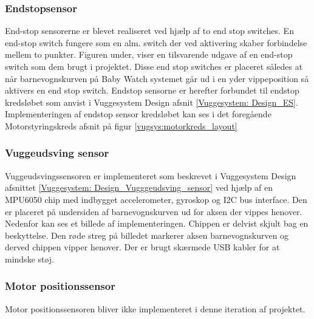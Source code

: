 \subsubsection{Endstopsensor}\label{Vuggesystem: Implementering_ES} 
End-stop sensorerne er blevet realiseret ved hjælp af to end stop switches. En end-stop switch fungere som en alm. switch der ved aktivering skaber forbindelse mellem to punkter. Figuren under, viser en tilsvarende udgave af en end-stop switch som dem brugt i projektet.
 Disse end stop switches er placeret således at når barnevognskurven på Baby Watch systemet går ud i en yder vippeposition så aktivers en end stop switch.
Endstop sensorne er herefter forbundet til endstop kredsløbet som anvist i Vuggesystem Design afsnit \vref{Vuggesystem: Design_ES}. \\
Implementeringen af endstop sensor kredsløbet kan ses i det foregående Motorstyringskreds afsnit på figur \vref{vugsys:motorkreds_layout}
\newpage
\subsubsection{Vuggeudsving sensor}
\label{Vuggesystem: Implementering_VuggeudsvingSensor}
Vuggeudsvingssensoren er implementeret som beskrevet i Vuggesystem Design afsnittet \vref{Vuggesystem: Design_Vugggeudsving_sensor} ved hjælp af en MPU6050 chip med indbygget accelerometer, gyroskop og I2C bus interface. Den er placeret på undersiden af barnevognskurven ud for aksen der vippes henover. Nedenfor kan ses et billede af implementeringen. 
Chippen er delvist skjult bag en beskyttelse. Den røde streg på billedet markerer aksen barnevognskurven og derved chippen vipper henover. 
Der er brugt skærmede USB kabler for at mindske støj.


\subsubsection{Motor positionssensor}
Motor positionssensoren bliver ikke implementeret i denne iteration af projektet.

\newpage
